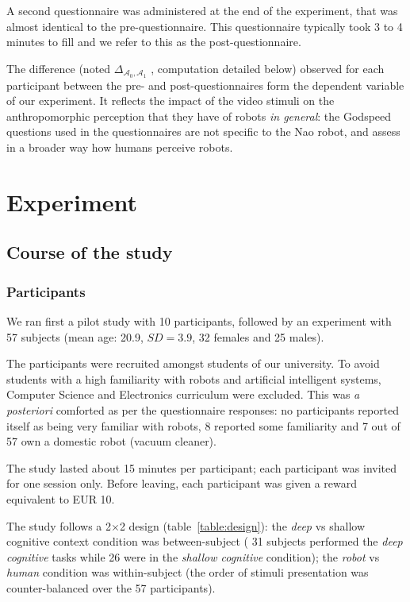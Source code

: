 \documentclass[lettersize, apacite, twoside, HRI]{apa_HRI}
\newcommand{\deltaant}{{ $\Delta_{\mathcal{A}_0,\mathcal{A}_1}$ }}
\begin{document}
A second questionnaire was administered at the end of the experiment, that was
almost identical to the pre-questionnaire.  This questionnaire typically took 3
to 4 minutes to fill and we refer to this as the post-questionnaire.

The difference (noted \deltaant, computation detailed below) observed for
each participant between the pre- and post-questionnaires form the dependent
variable of our experiment. It reflects the impact of the video stimuli on the
anthropomorphic perception that they have of robots \emph{in general}: the
Godspeed questions used in the questionnaires are not specific to the Nao robot,
and assess in a broader way how humans perceive robots.

\section{Experiment}

\subsection{Course of the study}

\subsubsection{Participants}

We ran first a pilot study with 10 participants, followed by an experiment with
57 subjects (mean age: 20.9, $SD=3.9$, 32 females and 25 males).

The participants were recruited amongst students of our university. To avoid
students with a high familiarity with robots and artificial intelligent systems,
Computer Science and Electronics curriculum were excluded. This was \textit{a
posteriori} comforted as per the questionnaire responses: no participants
reported itself as being very familiar with robots, 8 reported some familiarity
and 7 out of 57 own a domestic robot (vacuum cleaner).

The study lasted about 15 minutes per participant; each participant was invited
for one session only. Before leaving, each participant was given a reward
equivalent to EUR 10.

The study follows a 2$\times$2 design (table~\ref{table:design}): the
\emph{deep} vs {shallow cognitive context} condition was between-subject ( 31
subjects performed the \emph{deep cognitive} tasks while 26 were in the
\emph{shallow cognitive} condition); the \emph{robot} vs \emph{human} condition
was within-subject (the order of stimuli presentation was counter-balanced over
the 57 participants).
\end{document}
